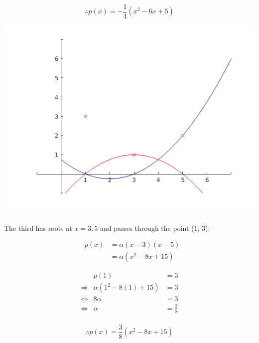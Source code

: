 \documentclass[MathsNotesBase.tex]{subfiles}
\begin{document}
\begin{par}
$$\therefore p(x) = -\frac{1}{4}(x^2-6x+5)$$
\end{par}


\begin{center}
\includegraphics[width=\linewidth]{figure_2}
\end{center}


\begin{par}
\begin{flushleft}
The third has roots at $x=3,5$ and passes through the point (1, 3):
\end{flushleft}
\end{par}

\begin{par}
$$\begin{array}{lcr}
&p(x) &= \alpha(x-3)(x-5)\\
&&= \alpha(x^2-8x+15)
\end{array}$$
\end{par}

\begin{par}
$$\begin{array}{lcr}
&p(1)&=3 \\
\Longrightarrow &\alpha(1^2-8(1) + 15) &= 3 \\
\iff &8\alpha&=3\\
\iff &\alpha &= \frac{3}{8}\\
\end{array}$$
\end{par}

\begin{par}
$$\therefore p(x) = \frac{3}{8}(x^2-8x+15)$$
\end{par}
\end{document}

